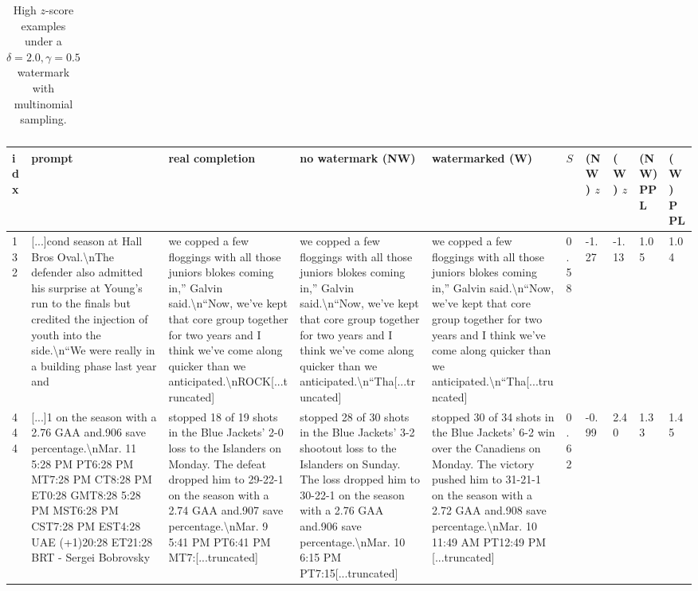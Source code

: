 \documentclass{article}
\theoremstyle{plain}
\theoremstyle{definition}
\theoremstyle{remark}
\begin{document}
\begin{table}[t]
\begin{tabular}{p{0.2cm}|p{2.75cm}|p{2.75cm}|p{2.75cm}|p{2.75cm}|p{0.2cm}|p{0.42cm}|p{0.42cm}|p{0.3cm}|p{0.3cm}}
\bottomrule
\end{tabular}
\caption{High $z$-score examples under a $\delta=2.0,\gamma=0.5$ watermark with multinomial sampling.}\label{tab:high-z-examples}
\end{table}



\begin{table}[t]
\tiny
\begin{tabular}{p{0.2cm}|p{2.75cm}|p{2.75cm}|p{2.75cm}|p{2.75cm}|p{0.2cm}|p{0.42cm}|p{0.42cm}|p{0.3cm}|p{0.3cm}}
\toprule
 idx &  prompt & real completion &  no watermark (NW) &  watermarked (W) &  $S$ &  (NW) $z$ &  (W) $z$ &  (NW) PPL &  (W) PPL \\
 \midrule
 132 & [...]cond season at Hall Bros Oval.\textbackslash nThe defender also admitted his surprise at Young’s run to the finals but credited the injection of youth into the side.\textbackslash n“We were really in a building phase last year and &  we copped a few floggings with all those juniors blokes coming in,” Galvin said.\textbackslash n“Now, we’ve kept that core group together for two years and I think we’ve come along quicker than we anticipated.\textbackslash nROCK[...truncated] &  we copped a few floggings with all those juniors blokes coming in,” Galvin said.\textbackslash n“Now, we’ve kept that core group together for two years and I think we’ve come along quicker than we anticipated.\textbackslash n“Tha[...truncated] &  we copped a few floggings with all those juniors blokes coming in,” Galvin said.\textbackslash n“Now, we’ve kept that core group together for two years and I think we’ve come along quicker than we anticipated.\textbackslash n“Tha[...truncated] &               0.58 &          -1.27 &         -1.13 &       1.05 &      1.04 \\\midrule
 444 &  [...]1 on the season with a 2.76 GAA and.906 save percentage.\textbackslash nMar. 11 5:28 PM PT6:28 PM MT7:28 PM CT8:28 PM ET0:28 GMT8:28 5:28 PM MST6:28 PM CST7:28 PM EST4:28 UAE (+1)20:28 ET21:28 BRT - Sergei Bobrovsky &   stopped 18 of 19 shots in the Blue Jackets' 2-0 loss to the Islanders on Monday. The defeat dropped him to 29-22-1 on the season with a 2.74 GAA and.907 save percentage.\textbackslash nMar. 9 5:41 PM PT6:41 PM MT7:[...truncated] &   stopped 28 of 30 shots in the Blue Jackets' 3-2 shootout loss to the Islanders on Sunday. The loss dropped him to 30-22-1 on the season with a 2.76 GAA and.906 save percentage.\textbackslash nMar. 10 6:15 PM PT7:15[...truncated] &   stopped 30 of 34 shots in the Blue Jackets' 6-2 win over the Canadiens on Monday. The victory pushed him to 31-21-1 on the season with a 2.72 GAA and.908 save percentage.\textbackslash nMar. 10 11:49 AM PT12:49 PM [...truncated] &               0.62 &          -0.99 &          2.40 &       1.33 &      1.45 \\\midrule

\end{tabular}
\end{table}
\end{document}
